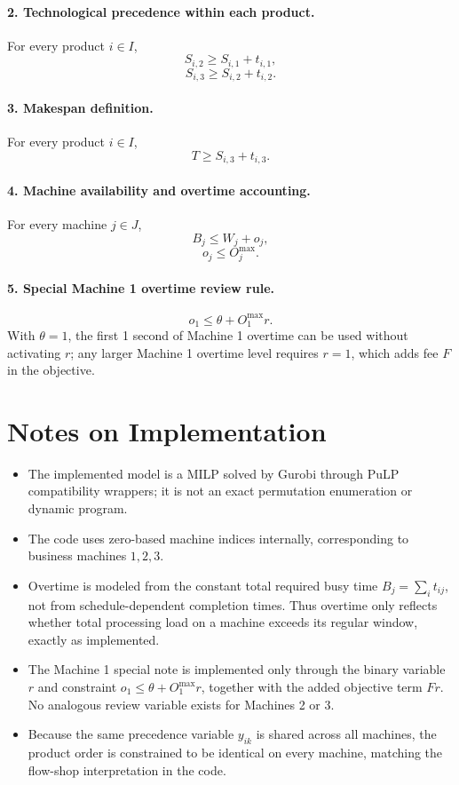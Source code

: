 \paragraph{2. Technological precedence within each product.}
For every product \(i\in I\),
\[
S_{i,2} \ge S_{i,1} + t_{i,1},
\]
\[
S_{i,3} \ge S_{i,2} + t_{i,2}.
\]

\paragraph{3. Makespan definition.}
For every product \(i\in I\),
\[
T \ge S_{i,3} + t_{i,3}.
\]

\paragraph{4. Machine availability and overtime accounting.}
For every machine \(j\in J\),
\[
B_j \le W_j + o_j,
\]
\[
o_j \le O_j^{\max}.
\]

\paragraph{5. Special Machine 1 overtime review rule.}
\[
o_1 \le \theta + O_1^{\max} r.
\]
With \(\theta=1\), the first 1 second of Machine 1 overtime can be used without activating \(r\); any larger Machine 1 overtime level requires \(r=1\), which adds fee \(F\) in the objective.

\section*{Notes on Implementation}

\begin{itemize}
    \item The implemented model is a MILP solved by Gurobi through PuLP compatibility wrappers; it is not an exact permutation enumeration or dynamic program.
    \item The code uses zero-based machine indices internally, corresponding to business machines \(1,2,3\).
    \item Overtime is modeled from the constant total required busy time \(B_j=\sum_i t_{ij}\), not from schedule-dependent completion times. Thus overtime only reflects whether total processing load on a machine exceeds its regular window, exactly as implemented.
    \item The Machine 1 special note is implemented only through the binary variable \(r\) and constraint \(o_1 \le \theta + O_1^{\max}r\), together with the added objective term \(Fr\). No analogous review variable exists for Machines 2 or 3.
    \item Because the same precedence variable \(y_{ik}\) is shared across all machines, the product order is constrained to be identical on every machine, matching the flow-shop interpretation in the code.
\end{itemize}
